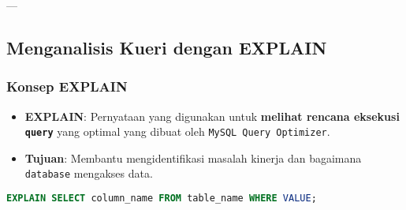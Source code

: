 \documentclass{article}
\begin{document}
---

\subsection{Menganalisis Kueri dengan EXPLAIN}

\subsubsection{Konsep EXPLAIN}
\begin{itemize}
    \item \textbf{EXPLAIN}: Pernyataan yang digunakan untuk \textbf{melihat rencana eksekusi \texttt{query}} yang optimal yang dibuat oleh \texttt{MySQL Query Optimizer}.
    \item \textbf{Tujuan}: Membantu mengidentifikasi masalah kinerja dan bagaimana \texttt{database} mengakses data.
\end{itemize}
\begin{lstlisting}[language=SQL, caption={Sintaks EXPLAIN}, captionpos=b]
EXPLAIN SELECT column_name FROM table_name WHERE VALUE;
\end{lstlisting}
\end{document}
